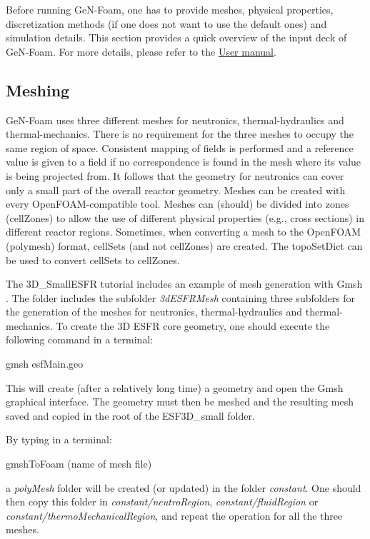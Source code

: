 Before running Ge\+N-\/\+Foam, one has to provide meshes, physical properties, discretization methods (if one does not want to use the default ones) and simulation details. This section provides a quick overview of the input deck of Ge\+N-\/\+Foam. For more details, please refer to the \hyperlink{USERMAN}{User manual}.

\subsection*{Meshing}

Ge\+N-\/\+Foam uses three different meshes for neutronics, thermal-\/hydraulics and thermal-\/mechanics. There is no requirement for the three meshes to occupy the same region of space. Consistent mapping of fields is performed and a reference value is given to a field if no correspondence is found in the mesh where its value is being projected from. It follows that the geometry for neutronics can cover only a small part of the overall reactor geometry. Meshes can be created with every Open\+F\+O\+A\+M-\/compatible tool. Meshes can (should) be divided into zones (cell\+Zones) to allow the use of different physical properties (e.\+g., cross sections) in different reactor regions. Sometimes, when converting a mesh to the Open\+F\+O\+AM (polymesh) format, cell\+Sets (and not cell\+Zones) are created. The topo\+Set\+Dict can be used to convert cell\+Sets to cell\+Zones.

The 3\+D\+\_\+\+Small\+E\+S\+FR tutorial includes an example of mesh generation with Gmsh \cite{https://doi.org/10.1002/nme.2579}. The folder includes the subfolder {\itshape 3d\+E\+S\+F\+R\+Mesh} containing three subfolders for the generation of the meshes for neutronics, thermal-\/hydraulics and thermal-\/mechanics. To create the 3D E\+S\+FR core geometry, one should execute the following command in a terminal\+:

{\ttfamily gmsh esf\+Main.\+geo}

This will create (after a relatively long time) a geometry and open the Gmsh graphical interface. The geometry must then be meshed and the resulting mesh saved and copied in the root of the E\+S\+F3\+D\+\_\+small folder.

By typing in a terminal\+:

{\ttfamily gmsh\+To\+Foam (name of mesh file)}

a {\itshape poly\+Mesh} folder will be created (or updated) in the folder {\itshape constant}. One should then copy this folder in {\itshape constant/neutro\+Region}, {\itshape constant/fluid\+Region} or {\itshape constant/thermo\+Mechanical\+Region}, and repeat the operation for all the three meshes.

